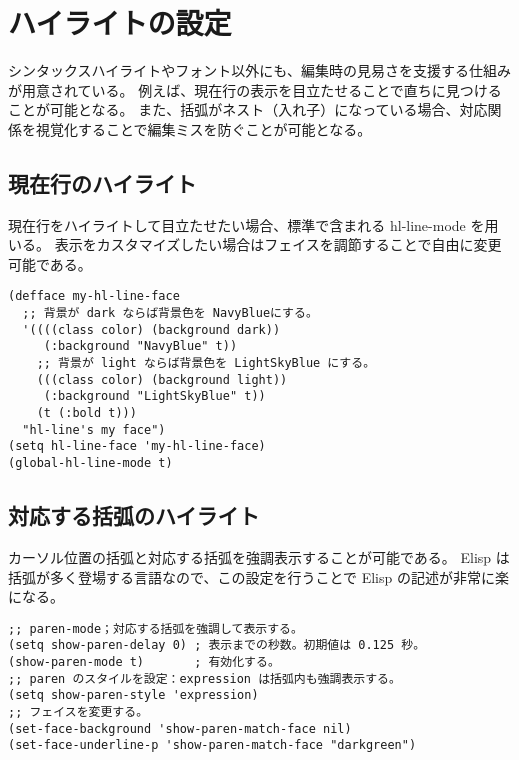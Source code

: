 \section{ハイライトの設定}
シンタックスハイライトやフォント以外にも、編集時の見易さを支援する仕組みが用意されている。
例えば、現在行の表示を目立たせることで直ちに見つけることが可能となる。
また、括弧がネスト（入れ子）になっている場合、対応関係を視覚化することで編集ミスを防ぐことが可能となる。
\subsection{現在行のハイライト}
現在行をハイライトして目立たせたい場合、標準で含まれる hl-line-mode を用いる。
表示をカスタマイズしたい場合はフェイスを調節することで自由に変更可能である。
\begin{mdframed}[roundcorner=0.50zw,leftmargin=3.00zw,rightmargin=3.00zw,skipabove=0.40zw,skipbelow=0.40zw,innertopmargin=4.00pt,innerbottommargin=4.00pt,innerleftmargin=5.00pt,innerrightmargin=5.00pt,linecolor=gray!020,linewidth=0.50pt,backgroundcolor=gray!20]
\begin{verbatim}
(defface my-hl-line-face
  ;; 背景が dark ならば背景色を NavyBlueにする。
  '((((class color) (background dark))
     (:background "NavyBlue" t))
    ;; 背景が light ならば背景色を LightSkyBlue にする。
    (((class color) (background light))
     (:background "LightSkyBlue" t))
    (t (:bold t)))
  "hl-line's my face")
(setq hl-line-face 'my-hl-line-face)
(global-hl-line-mode t)
\end{verbatim}
\end{mdframed}
\subsection{対応する括弧のハイライト}
カーソル位置の括弧と対応する括弧を強調表示することが可能である。
Elisp は括弧が多く登場する言語なので、この設定を行うことで Elisp の記述が非常に楽になる。
\begin{mdframed}[roundcorner=0.50zw,leftmargin=3.00zw,rightmargin=3.00zw,skipabove=0.40zw,skipbelow=0.40zw,innertopmargin=4.00pt,innerbottommargin=4.00pt,innerleftmargin=5.00pt,innerrightmargin=5.00pt,linecolor=gray!020,linewidth=0.50pt,backgroundcolor=gray!20]
\begin{verbatim}
;; paren-mode；対応する括弧を強調して表示する。
(setq show-paren-delay 0) ; 表示までの秒数。初期値は 0.125 秒。
(show-paren-mode t)       ; 有効化する。
;; paren のスタイルを設定：expression は括弧内も強調表示する。
(setq show-paren-style 'expression)
;; フェイスを変更する。
(set-face-background 'show-paren-match-face nil)
(set-face-underline-p 'show-paren-match-face "darkgreen")
\end{verbatim}
\end{mdframed}
